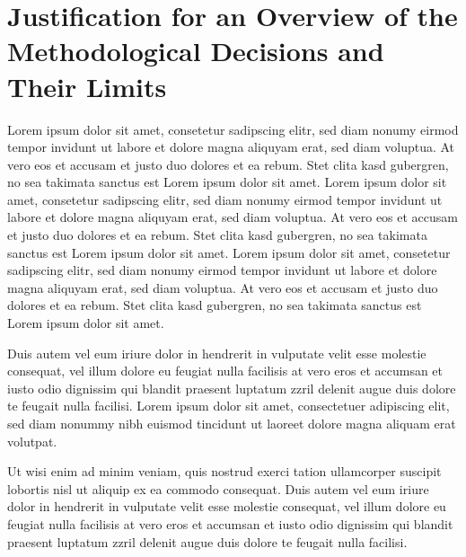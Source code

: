 \section{Justification for an Overview of the Methodological Decisions and Their Limits}
Lorem ipsum dolor sit amet, consetetur sadipscing elitr,  sed diam nonumy eirmod
tempor invidunt ut labore et dolore magna aliquyam erat, sed diam voluptua. At
vero eos et accusam et justo duo dolores et ea rebum. Stet clita kasd gubergren,
no sea takimata sanctus est Lorem ipsum dolor sit amet. Lorem ipsum dolor sit
amet, consetetur sadipscing elitr,  sed diam nonumy eirmod tempor invidunt ut
labore et dolore magna aliquyam erat, sed diam voluptua. At vero eos et accusam
et justo duo dolores et ea rebum. Stet clita kasd gubergren, no sea takimata
sanctus est Lorem ipsum dolor sit amet. Lorem ipsum dolor sit amet, consetetur
sadipscing elitr,  sed diam nonumy eirmod tempor invidunt ut labore et dolore
magna aliquyam erat, sed diam voluptua. At vero eos et accusam et justo duo
dolores et ea rebum. Stet clita kasd gubergren, no sea takimata sanctus est
Lorem ipsum dolor sit amet.

Duis autem vel eum iriure dolor in hendrerit in vulputate velit esse molestie
consequat, vel illum dolore eu feugiat nulla facilisis at vero eros et accumsan
et iusto odio dignissim qui blandit praesent luptatum zzril delenit augue duis
dolore te feugait nulla facilisi. Lorem ipsum dolor sit amet, consectetuer
adipiscing elit, sed diam nonummy nibh euismod tincidunt ut laoreet dolore
magna aliquam erat volutpat.

Ut wisi enim ad minim veniam, quis nostrud exerci tation ullamcorper suscipit
lobortis nisl ut aliquip ex ea commodo consequat. Duis autem vel eum iriure
dolor in hendrerit in vulputate velit esse molestie consequat, vel illum dolore
eu feugiat nulla facilisis at vero eros et accumsan et iusto odio dignissim qui
blandit praesent luptatum zzril delenit augue duis dolore te feugait nulla
facilisi.

